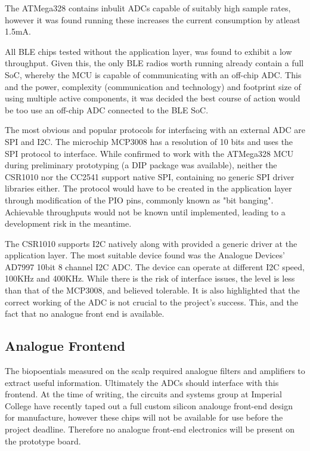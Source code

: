 \documentclass[]{article}
\begin{document}
The ATMega328 contains inbulit \ac{ADC}s capable of suitably high sample rates, however it was found running these increases the current consumption by atleast 1.5mA. 

All \ac{BLE} chips tested without the application layer, was found to exhibit a low throughput. Given this, the only \ac{BLE} radios worth running already contain a full \ac{SoC}, whereby the \ac{MCU} is capable of communicating with an off-chip \ac{ADC}. This and the power, complexity (communication and technology) and footprint size of using multiple active components, it was decided the best course of action would be too use an off-chip ADC connected to the \ac{BLE} \ac{SoC}. 

The most obvious and popular protocols for interfacing with an external \ac{ADC} are \ac{SPI} and I2C. The microchip MCP3008 has a resolution of 10 bits and uses the \ac{SPI} protocol to interface. While confirmed to work with the ATMega328 MCU during preliminary prototyping (a \ac{DIP} package was available),  neither the CSR1010 nor the CC2541 support native SPI, containing no generic SPI driver libraries either. The protocol would have to be created in the application layer through modification of the \ac{PIO} pins, commonly known as "bit banging". Achievable throughputs would not be known until implemented, leading to a development risk in the meantime. 

The CSR1010 supports I2C natively along with provided a generic driver at the application layer. The most suitable device found was the Analogue Devices' AD7997 10bit 8 channel I2C ADC. The device can operate at different I2C speed, 100KHz and 400KHz. While there is the risk of interface issues, the level is less than that of the MCP3008, and believed tolerable. It is also highlighted that the correct working of the \ac{ADC} is not crucial to the project's success. This, and the fact that no analogue front end is available. 

\subsection{Analogue Frontend}

The biopoentials measured on the scalp required analogue filters and amplifiers to extract useful information. Ultimately the \ac{ADC}s should interface with this frontend.  At the time of writing, the circuits and systems group at Imperial College have recently taped out a full custom silicon analouge front-end design for manufacture, however these chips will not be available for use before the project deadline. Therefore no analogue front-end electronics will be present on the prototype board.
\end{document}
